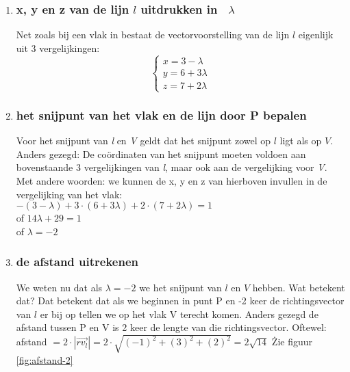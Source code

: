 \begin{enumerate}[label=(\alph*)]
\item \subsubsection{x, y en z van de lijn $  l $  uitdrukken in \ $  \lambda $}
Net zoals bij een vlak in \RD bestaat de vectorvoorstelling van de lijn $ l  $ eigenlijk uit 3 vergelijkingen:
\[\begin{cases}
x =  3 -\lambda \\
y =  6 + 3\lambda\\
z = 7 + 2\lambda
\end{cases}
\] 
\item \subsubsection{het snijpunt van  het  vlak en de lijn door P bepalen}
Voor het snijpunt van\textit{ l} en \textit{V} geldt dat het snijpunt zowel op $  l $ ligt als op $ V $. Anders gezegd: De coördinaten  van het snijpunt moeten voldoen aan bovenstaande 3 vergelijkingen van\textit{ l}, maar ook aan de vergelijking voor \textit{V}. Met andere woorden: we kunnen de x, y en z van hierboven invullen in de vergelijking van het vlak:\\
$ -(3 -\lambda) + 3\cdot(6 + 3\lambda) + 2\cdot(7 + 2\lambda) = 1$ \\
of $ 14\lambda + 29 = 1 $ \\of $  \lambda = -2 $

\item \subsubsection{de afstand uitrekenen}
We weten nu dat als $  \lambda = -2 $ we het snijpunt van $ l  $ en $ V $ hebben. Wat betekent dat? Dat betekent dat als we beginnen in punt P en -2 keer de richtingsvector van $  l $ er bij op tellen we op het vlak V terecht komen.
Anders gezegd de afstand tussen P en V is 2 keer de lengte van die richtingsvector. Oftewel: 
afstand $ = 2\cdot |\overrightarrow{rv_{l}}| = 2\cdot \sqrt{(-1)^{2} + (3)^{2} + (2)^{2} } = 2\sqrt{14} $ \. Zie  figuur  \ref{fig:afstand-2}
\end{enumerate}	


